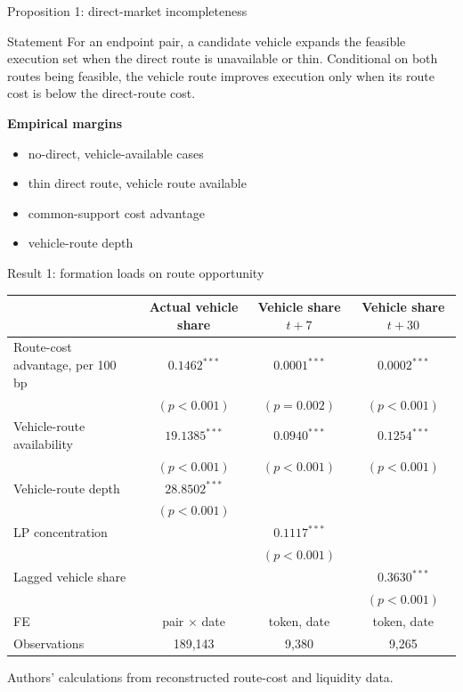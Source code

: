 \documentclass[aspectratio=169,11pt]{beamer}
\newcommand{\source}[1]{\vfill {\tiny\textcolor{DVCGrey}{#1}}}
\begin{document}
\begin{frame}{Proposition 1: direct-market incompleteness}
\begin{block}{Statement}
For an endpoint pair, a candidate vehicle expands the feasible execution set when the direct route is unavailable or thin. Conditional on both routes being feasible, the vehicle route improves execution only when its route cost is below the direct-route cost.
\end{block}
\vspace{0.6em}
\textbf{Empirical margins}
\begin{itemize}
  \item no-direct, vehicle-available cases
  \item thin direct route, vehicle route available
  \item common-support cost advantage
  \item vehicle-route depth
\end{itemize}
\end{frame}

\begin{frame}{Result 1: formation loads on route opportunity}
\scriptsize
\begin{tabular}{lccc}
\toprule
 & Actual vehicle share & Vehicle share $t+7$ & Vehicle share $t+30$ \\
\midrule
Route-cost advantage, per 100 bp & $0.1462^{***}$ & $0.0001^{***}$ & $0.0002^{***}$ \\
 & $(p<0.001)$ & $(p=0.002)$ & $(p<0.001)$ \\
Vehicle-route availability & $19.1385^{***}$ & $0.0940^{***}$ & $0.1254^{***}$ \\
 & $(p<0.001)$ & $(p<0.001)$ & $(p<0.001)$ \\
Vehicle-route depth & $28.8502^{***}$ & & \\
 & $(p<0.001)$ & & \\
LP concentration & & $0.1117^{***}$ & \\
 & & $(p<0.001)$ & \\
Lagged vehicle share & & & $0.3630^{***}$ \\
 & & & $(p<0.001)$ \\
\midrule
FE & pair $\times$ date & token, date & token, date \\
Observations & 189,143 & 9,380 & 9,265 \\
\bottomrule
\end{tabular}
\source{Authors' calculations from reconstructed route-cost and liquidity data.}
\end{frame}
\end{document}

